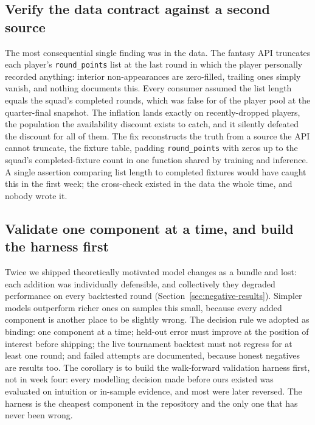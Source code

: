 \subsection{Verify the data contract against a second source}
\label{sec:lessons-data-contract}

The most consequential single finding was in the data. The fantasy API
truncates each player's \texttt{round\_points} list at the last round
in which the player personally recorded anything: interior
non-appearances are zero-filled, trailing ones simply vanish, and
nothing documents this. Every consumer assumed the list length equals
the squad's completed rounds, which was false for
\TruncationShareQf{} of the player pool at the quarter-final
snapshot. The inflation lands exactly on recently-dropped players,
the population the availability discount exists to catch, and it
silently defeated the discount for all of them. The fix reconstructs
the truth from a source the API cannot truncate, the fixture table,
padding \texttt{round\_points} with zeros up to the squad's
completed-fixture count in one function shared by training and
inference. A single assertion comparing list length to completed
fixtures would have caught this in the first week; the cross-check
existed in the data the whole time, and nobody wrote it.

\subsection{Validate one component at a time, and build the harness
first}
\label{sec:lessons-validation-gate}

Twice we shipped theoretically motivated model changes as a bundle and
lost: each addition was individually defensible, and collectively they
degraded performance on every backtested round
(Section~\ref{sec:negative-results}). Simpler models outperform richer
ones on samples this small, because every added component is another
place to be slightly wrong. The decision rule we adopted as binding:
one component at a time; held-out error must improve at the position
of interest before shipping; the live tournament backtest must not
regress for at least one round; and failed attempts are documented,
because honest negatives are results too. The corollary is to build
the walk-forward validation harness first, not in week four: every
modelling decision made before ours existed was evaluated on intuition
or in-sample evidence, and most were later reversed. The harness is
the cheapest component in the repository and the only one that has
never been wrong.

